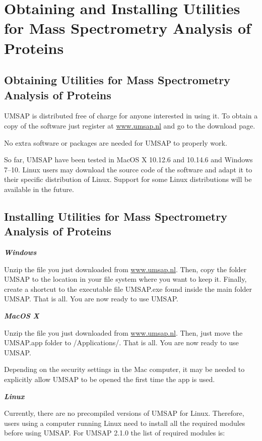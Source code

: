 \chapter{Obtaining and Installing Utilities for Mass Spectrometry Analysis of Proteins}

\section{Obtaining Utilities for Mass Spectrometry Analysis of Proteins}

UMSAP is distributed free of charge for anyone interested in using it. To obtain a copy of the software just register at \href{https://www.umsap.nl}{www.umsap.nl} and go to the download page.

No extra software or packages are needed for UMSAP to properly work.

So far, UMSAP have been tested in MacOS X \num[parse-numbers=false]{10.12.6} and \num[parse-numbers=false]{10.14.6} and Windows \numrange[range-phrase = /]{7}{10}. Linux users may download the source code of the software and adapt it to their specific distribution of Linux. Support for some Linux distributions will be available in the future. 

\section{Installing Utilities for Mass Spectrometry Analysis of Proteins}

\textit{\textbf{Windows}}

Unzip the file you just downloaded from \href{https://www.umsap.nl}{www.umsap.nl}. Then, copy the folder UMSAP to the location in your file system where you want to keep it. Finally, create a shortcut to the executable file UMSAP.exe found inside the main folder UMSAP. That is all. You are now ready to use UMSAP.

\textit{\textbf{MacOS X}}

Unzip the file you just downloaded from \href{https://www.umsap.nl}{www.umsap.nl}. Then, just move the UMSAP.app folder to /Applications/. That is all. You are now ready to use UMSAP. 

Depending on the security settings in the Mac computer, it may be needed to explicitly allow UMSAP to be opened the first time the app is used.

\textit{\textbf{Linux}}

Currently, there are no precompiled versions of UMSAP for Linux. Therefore, users using a computer running Linux need to install all the required modules before using UMSAP. For UMSAP \num[parse-numbers=false]{2.1.0} the list of required modules is:

